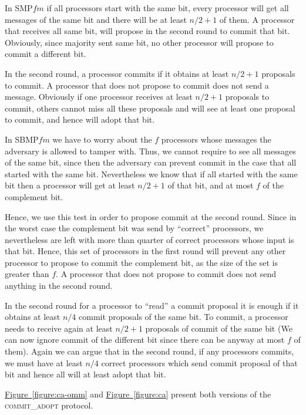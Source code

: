 \documentclass[11pt]{article}
\newcommand{\namedref}[2]{\hyperref[#2]{#1~\ref*{#2}}}
\newcommand{\figureref}[1]{\namedref{Figure}{#1}}
\newcommand{\SMPfm}{\mbox{SMP\!$f\!m$}\xspace}
\newcommand{\SBMPfm}{\mbox{SBMP\!$f\!m$}\xspace}
\newcommand{\ca}{{\small\textsc{commit\!\_adopt}}\xspace}
\begin{document}
In \SMPfm if all processors start with the same bit, every processor will get all messages of the same bit and there will be at least $n/2 + 1$ of them.
A processor that receives all same bit, will propose in the second round to commit that bit.
Obviously, since majority sent same bit, no other processor will propose to commit a different bit.
 
In the second round, a processor commits if it obtains at least $n/2+ 1$ proposals to commit.
A processor that does not propose to commit does not send a message.
Obviously if one processor receives  at least $n/2 +1$ proposals to commit, others cannot miss all these proposals and will see at least one proposal to commit,
and hence will adopt that bit.

In \SBMPfm we have to worry about the $f$ processors  whose messages the adversary is allowed to tamper with.
Thus, we cannot require to see all messages of the same bit, since then the adversary can prevent commit in the case
that all started with the same bit. Nevertheless we know that if all started with the same bit then a processor will get 
at least $n/2+1$ of that bit, and at most $f$ of the complement bit.

Hence, we use this test in order to propose commit at the second round. Since in the worst case the complement bit
was send by ``correct'' processors, we nevertheless are left with more than quarter of correct processors whose input is that bit.
Hence, this set of processors in the first round will prevent any other processor to propose to commit the complement bit, 
as the size of the set is greater than $f$. A processor that does not propose to commit does not send anything in the second round.

In the second round for a processor to ``read'' a commit proposal it is enough if it obtains at least $n/4$ commit proposals of the same
bit. To commit, a processor needs to receive again at least $n/2 +1$ proposals of commit of the same bit (We can now ignore commit
of the different bit since there can be anyway at most $f$ of them). 
Again we can argue that in the second round, if any processors commits, 
we must have at least $n/4$ correct processors which send commit proposal of that bit and hence all will at least adopt that bit.


\figureref{figure:ca-omm} and \figureref{figure:ca} present both versions of the \ca protocol. 
\end{document}
